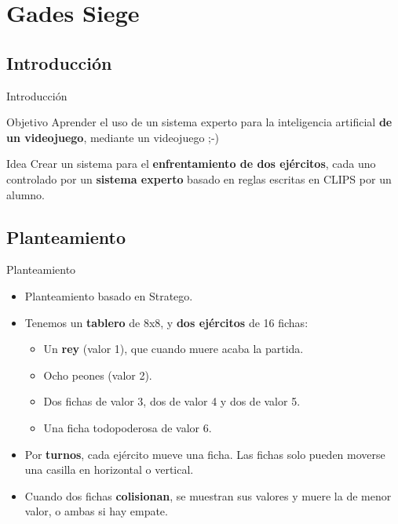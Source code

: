 \documentclass[smaller,spanish,xcolor=svgnames]{beamer}
\begin{document}
\section{Gades Siege}

\subsection{Introducción}

\begin{frame}{Introducción}
  \begin{block}{Objetivo}
    Aprender el uso de un sistema experto para la inteligencia artificial \textbf{de un videojuego}, mediante un videojuego ;-)
  \end{block}

  \begin{block}{Idea}
    Crear un sistema para el \textbf{enfrentamiento de dos ejércitos}, cada uno
    controlado por un \textbf{sistema experto} basado en reglas escritas en
    CLIPS por un alumno.
  \end{block}

\end{frame}

\subsection{Planteamiento}

\begin{frame}{Planteamiento}
  \begin{block}{}
    \begin{itemize}
    \item Planteamiento basado en Stratego.
    \item Tenemos un \textbf{tablero} de 8x8, y \textbf{dos ejércitos} de 16 fichas:
      \begin{itemize}
      \item Un \textbf{rey} (valor 1), que cuando muere acaba la partida.
      \item Ocho peones (valor 2).
      \item Dos fichas de valor 3, dos de valor 4 y dos de valor 5.
      \item Una ficha todopoderosa de valor 6.
      \end{itemize}
    \item Por \textbf{turnos}, cada ejército mueve una ficha. Las fichas solo
      pueden moverse una casilla en horizontal o vertical.
    \item Cuando dos fichas \textbf{colisionan}, se muestran sus valores y muere la de
      menor valor, o ambas si hay empate.
    \end{itemize}
  \end{block} 
\end{frame}
\end{document}
